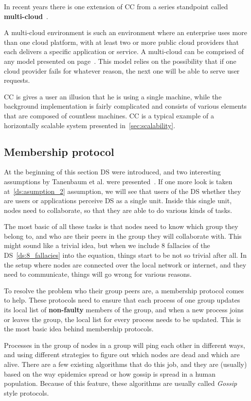 \noindent
In recent years there is one extension of CC from a series standpoint called \textbf{multi-cloud}~\cite{HongDSH19, Ardagna15}. 

A multi-cloud environment is such an environment where an enterprise uses more than one cloud platform, with at least two or more public cloud providers that each delivers a specific application or service. A multi-cloud can be comprised of any model presented on page~\pageref{sec_types}. This model relies on the possibility that if one cloud provider fails for whatever reason, the next one will be able to serve user requests.

CC is gives a user an illusion that he is using a single machine, while the background implementation is fairly complicated and consists of various elements that are composed of countless machines. CC is a typical example of a horizontally scalable system presented in~\ref{sec:scalability}.
%
%
\subsection{Membership protocol}\label{sec:memership_protocol}
%
At the beginning of this section DS were introduced, and two interesting assumptions by Tanenbaum et al. were presented~\cite{SteenT16, 0019513}. If one more look is taken at~\ref{ds:asumption_2} assumption, we will see that users of the DS whether they are users or applications perceive DS as a single unit. Inside this single unit, nodes need to collaborate, so that they are able to do various kinds of tasks.

The most basic of all these tasks is that nodes need to know which group they belong to, and who are their peers in the group they will collaborate with. This might sound like a trivial idea, but when we include 8 fallacies of the DS~\ref{ds:8_fallacies} into the equation, things start to be not so trivial after all. In the setup where nodes are connected over the local network or internet, and they need to communicate, things will go wrong for various reasons.

To resolve the problem who their group peers are, a membership protocol comes to help. These protocols need to ensure that each process of one group updates its local list of \textbf{non-faulty} members of the group, and when a new process joins or leaves the group, the local list for every process needs to be updated. This is the most basic idea behind membership protocols.

Processes in the group of nodes in a group will ping each other in different ways, and using different strategies to figure out which nodes are dead and which are alive. There are a few existing algorithms that do this job, and they are (usually) based on the way epidemics spread or how gossip is spread in a human population. Because of this feature, these algorithms are usually called \textit{Gossip} style protocols.

